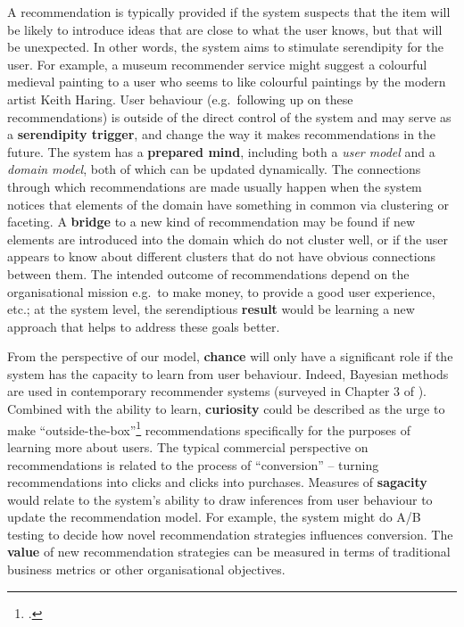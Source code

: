 A recommendation is typically provided if the system suspects that the
item will be likely to introduce ideas that are close to what the user
knows, but that will be unexpected.  In other words, the system aims
to stimulate serendipity for the user. For example, a museum
recommender service might suggest a colourful medieval painting to a
user who seems to like colourful paintings by the modern artist Keith
Haring.  User behaviour (e.g.~following up on these recommendations)
is outside of the direct control of the system and may serve as a
\textbf{serendipity trigger}, and change the way it makes
recommendations in the future.  The system has a \textbf{prepared
  mind}, including both a \emph{user model} and a \emph{domain model},
both of which can be updated dynamically.  The connections through
which recommendations are made usually happen when the system notices
that elements of the domain have something in common via clustering or
faceting.  A \textbf{bridge} to a new kind of recommendation may be
found if new elements are introduced into the domain which do not
cluster well, or if the user appears to know about different clusters
that do not have obvious connections between them.  The intended
outcome of recommendations depend on the organisational mission
e.g.~to make money, to provide a good user experience, etc.; at the
system level, the serendiptious \textbf{result} would be learning a
new approach that helps to address these goals better.

From the perspective of our model, \textbf{chance} will only have a
significant role if the system has the capacity to learn from user
behaviour.  Indeed, Bayesian methods are used in contemporary recommender systems
(surveyed in Chapter 3 of ).  Combined with the ability to learn, \textbf{curiosity}
could be described as the urge to make
``outside-the-box''\footnote{.}
recommendations specifically for the purposes of learning more about
users.  The typical commercial perspective on recommendations is
related to the process of ``conversion'' -- turning recommendations
into clicks and clicks into purchases.  Measures of \textbf{sagacity}
would relate to the system's ability to draw inferences from user
behaviour to update the recommendation model.  For example, the system
might do A/B testing to decide how novel recommendation strategies
influences conversion.  The \textbf{value} of new recommendation
strategies can be measured in terms of traditional business metrics or
other organisational objectives.
